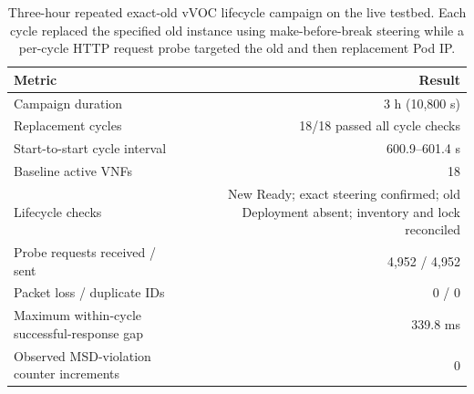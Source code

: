 \documentclass[final,5p]{elsarticle}
\newcommand{\rev}[1]{\textcolor{revisiongreen}{#1}}
\let\newrev\rev
\begin{document}
\begin{table}[p]
\centering
\caption{\newrev{SAF-H timing versus synthetic topology size (10 seeds; 300 decisions per seed). Timings in ms are means of seed-level percentiles; Set denotes feasible-set construction.}}
\label{tab:synthetic_scalability}
\footnotesize
{\color{revisiongreen}
\setlength{\tabcolsep}{3pt}
}
\end{table}

\begin{table}[p]
\centering
\caption{\newrev{Three-hour repeated exact-old vVOC lifecycle campaign on the live testbed. Each cycle replaced the specified old instance using make-before-break steering while a per-cycle HTTP request probe targeted the old and then replacement Pod IP.}}
\label{tab:hil_repeated_lifecycle}
{\color{revisiongreen}
\small
\begin{tabular}{@{}lr@{}}
\toprule
Metric & Result \\
\midrule
Campaign duration & 3 h (10,800 s) \\
Replacement cycles & 18/18 passed all cycle checks \\
Start-to-start cycle interval & 600.9--601.4 s \\
Baseline active VNFs & 18 \\
Lifecycle checks & New Ready; exact steering confirmed; old Deployment absent; inventory and lock reconciled \\
Probe requests received / sent & 4,952 / 4,952 \\
Packet loss / duplicate IDs & 0 / 0 \\
Maximum within-cycle successful-response gap & 339.8 ms \\
Observed MSD-violation counter increments & 0 \\
\bottomrule
\end{tabular}
}
\end{table}
\end{document}
